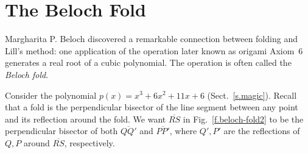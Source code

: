 \section{The Beloch Fold}\label{s.beloch-fold}

Margharita P. Beloch discovered a remarkable connection between folding and Lill's method: one application of the operation later known as origami Axiom~6 generates a real root of a cubic polynomial. The operation is often called the \emph{Beloch fold}.

Consider the polynomial $p(x)=x^3+6x^2+11x+6$ (Sect.~\ref{s.magic}). Recall that a fold is the perpendicular bisector of the line segment between any point and its reflection around the fold. We want $\overline{RS}$ in Fig.~\ref{f.beloch-fold2} to be the perpendicular bisector of both $\overline{QQ'}$ and $\overline{PP'}$, where $Q',P'$ are the reflections of $Q,P$ around $\overline{RS}$, respectively.

